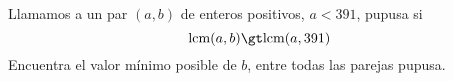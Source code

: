 Llamamos a un par $(a,b)$ de enteros positivos, $a\lt391$, pupusa si
\[\textup{lcm}(a,b)\gt\textup{lcm}(a,391) \]
Encuentra el valor mínimo posible de $b$, entre todas las parejas pupusa.
